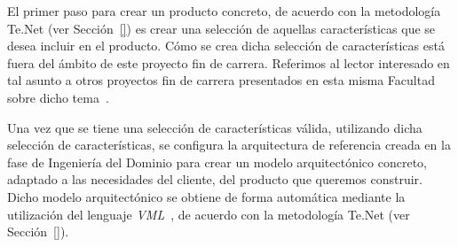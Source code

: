 

El primer paso para crear un producto concreto, de acuerdo con la metodología Te.Net (ver Sección~\ref{}) es crear una selección de aquellas características que se desea incluir en el producto. Cómo se crea dicha selección de características está fuera del ámbito de este proyecto fin de carrera. Referimos al lector interesado en tal asunto a otros proyectos fin de carrera presentados en esta misma Facultad sobre dicho tema~\citep{}.

Una vez que se tiene una selección de características válida, utilizando dicha selección de características, se configura la arquitectura de referencia creada en la fase de Ingeniería del Dominio para crear un modelo arquitectónico concreto, adaptado a las necesidades del cliente, del producto que queremos construir.  Dicho modelo arquitectónico se obtiene de forma automática mediante la utilización del lenguaje \emph{VML}~\citep{}, de acuerdo con la metodología Te.Net (ver Sección~\ref{}).



